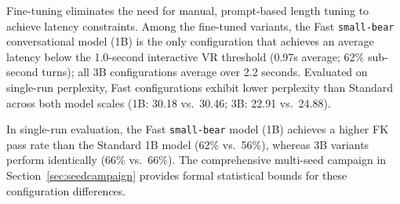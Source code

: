 \documentclass[pdflatex,sn-mathphys-num]{sn-jnl-official}%
\begin{document}
Fine-tuning eliminates the need for manual, prompt-based length tuning to achieve latency constraints. Among the fine-tuned variants, the Fast \texttt{small-bear} conversational model (1B) is the only configuration that achieves an average latency below the 1.0-second interactive VR threshold (0.97s average; 62\% sub-second turns); all 3B configurations average over 2.2 seconds. Evaluated on single-run perplexity, Fast configurations exhibit lower perplexity than Standard across both model scales (1B: 30.18 vs.\ 30.46; 3B: 22.91 vs.\ 24.88).

In single-run evaluation, the Fast \texttt{small-bear} model (1B) achieves a higher FK pass rate than the Standard 1B model (62\% vs.\ 56\%), whereas 3B variants perform identically (66\% vs.\ 66\%). The comprehensive multi-seed campaign in Section~\ref{sec:seedcampaign} provides formal statistical bounds for these configuration differences.
\end{document}
